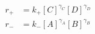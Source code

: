 \begin{eqnarray}
r_+  & =  k_+[C]^{\gamma_C}[D]^{\gamma_D} \\
r_-  & =  k_-[A]^{\gamma_A}[B]^{\gamma_B} \\
\end{eqnarray}